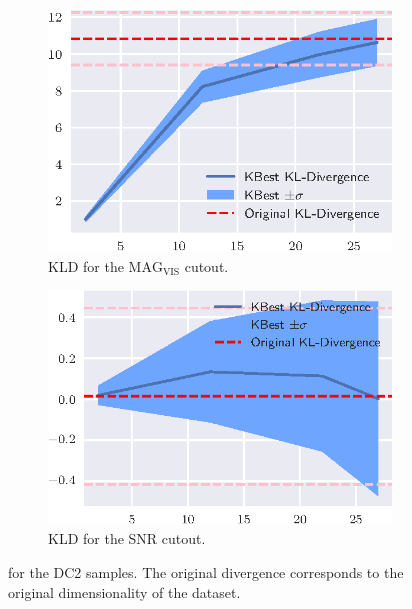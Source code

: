 \begin{figure}[htbp]
    \begin{subfigure}[]{0.5\textwidth}
    \includegraphics[width=\textwidth]{images/6_som/divergence/dc2_mag_divergence.eps}
    \caption{\gls{KLD} for the $\text{MAG}_\text{VIS}$ cutout.}
    \end{subfigure}
    \hfill
    \begin{subfigure}[]{0.5\textwidth}
    \includegraphics[width=\textwidth]{images/6_som/divergence/dc2_snr_divergence.eps}
    \caption{\gls{KLD} for the \gls{SNR} cutout.}
    \end{subfigure}
    \caption{ for the DC2 samples. The original divergence
    corresponds to the original dimensionality of the dataset.}
    \label{fig:divergence_dc2}
\end{figure}

